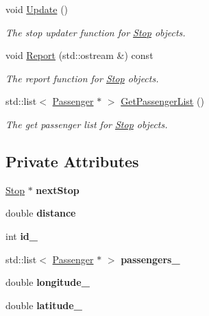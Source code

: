 \begin{DoxyCompactItemize}
void \hyperlink{classStop_aa373ae256ce6bc01ef13e876dfdec5bd}{Update} ()
\begin{DoxyCompactList}\small\item\em The stop updater function for \hyperlink{classStop}{Stop} objects. \end{DoxyCompactList}\item 
void \hyperlink{classStop_a8e286b7cca2dce6977ebda6f01805d94}{Report} (std\+::ostream \&) const
\begin{DoxyCompactList}\small\item\em The report function for \hyperlink{classStop}{Stop} objects. \end{DoxyCompactList}\item 
std\+::list$<$ \hyperlink{classPassenger}{Passenger} $\ast$ $>$ \hyperlink{classStop_a57c093d381664512dd576cf02a88bea6}{Get\+Passenger\+List} ()
\begin{DoxyCompactList}\small\item\em The get passenger list for \hyperlink{classStop}{Stop} objects. \end{DoxyCompactList}\end{DoxyCompactItemize}
\subsection*{Private Attributes}
\begin{DoxyCompactItemize}
\item 
\mbox{\label{classStop_aa687fb4e9e5876af53b0f40459ae9d49}} 
\hyperlink{classStop}{Stop} $\ast$ {\bfseries next\+Stop}
\item 
\mbox{\label{classStop_a62a29cc045a4e927a367eee662cc5d2d}} 
double {\bfseries distance}
\item 
\mbox{\label{classStop_a71becdbe8bf6168f72f9c8ea2b3dc0c4}} 
int {\bfseries id\+\_\+}
\item 
\mbox{\label{classStop_a1e75327b0aadd184120bf6a85eb641fa}} 
std\+::list$<$ \hyperlink{classPassenger}{Passenger} $\ast$ $>$ {\bfseries passengers\+\_\+}
\item 
\mbox{\label{classStop_a6fbad9a47cf803d0f43a60d3b954505c}} 
double {\bfseries longitude\+\_\+}
\item 
\mbox{\label{classStop_a4314074f0842c7e2483d341061bdb293}} 
double {\bfseries latitude\+\_\+}
\end{DoxyCompactItemize}


